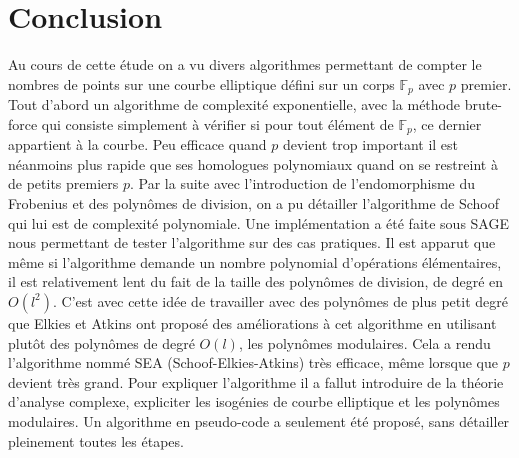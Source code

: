\documentclass[12pt]{article}
\begin{document}
\section{Conclusion}
Au cours de cette étude on a vu divers algorithmes permettant de compter le nombres de points sur une courbe elliptique défini sur un corps $\mathbb{F}_p$ avec $p$ premier. Tout d'abord un algorithme de complexité exponentielle, avec la méthode brute-force qui consiste simplement à vérifier si pour tout élément de $\mathbb{F}_p$, ce dernier appartient à la courbe. Peu efficace quand $p$ devient trop important il est néanmoins plus rapide que ses homologues polynomiaux quand on se restreint à de petits premiers $p$. Par la suite avec l'introduction de l'endomorphisme du Frobenius et des polynômes de division, on a pu détailler l'algorithme de Schoof qui lui est de complexité polynomiale. Une implémentation a été faite sous SAGE nous permettant de tester l'algorithme sur des cas pratiques. Il est apparut que même si l'algorithme demande un nombre polynomial d'opérations élémentaires, il est relativement lent du fait de la taille des polynômes de division, de degré en $O(l^2)$. C'est avec cette idée de travailler avec des polynômes de plus petit degré que Elkies et Atkins ont proposé des améliorations à cet algorithme en utilisant plutôt des polynômes de degré $O(l)$, les polynômes modulaires. Cela a rendu l’algorithme nommé SEA (Schoof-Elkies-Atkins) très efficace, même lorsque que $p$ devient très grand. Pour expliquer l'algorithme il a fallut introduire de la théorie d'analyse complexe, expliciter les isogénies de courbe elliptique et les polynômes modulaires. Un algorithme en pseudo-code a seulement été proposé, sans détailler pleinement toutes les étapes. 
\newpage


\end{document}
